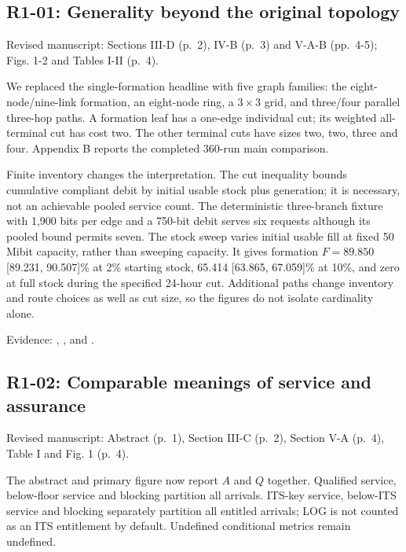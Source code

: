 \documentclass[a4paper,11pt]{article}
\begin{document}
\subsection{R1-01: Generality beyond the original topology}\label{r1-01-generality-beyond-the-original-topology}

Revised manuscript: Sections III-D (p.~2), IV-B (p.~3) and V-A-B (pp.~4-5); Figs. 1-2 and Tables I-II (p.~4).

We replaced the single-formation headline with five graph families: the eight-node/nine-link formation, an eight-node ring, a \(3\times3\) grid, and three/four parallel three-hop paths. A formation leaf has a one-edge individual cut; its weighted all-terminal cut has cost two. The other terminal cuts have sizes two, two, three and four. Appendix B reports the completed 360-run main comparison.

Finite inventory changes the interpretation. The cut inequality bounds cumulative compliant debit by initial usable stock plus generation; it is necessary, not an achievable pooled service count. The deterministic three-branch fixture with 1,900 bits per edge and a 750-bit debit serves six requests although its pooled bound permits seven. The stock sweep varies initial usable fill at fixed 50 Mibit capacity, rather than sweeping capacity. It gives formation \(F=89.850\) {[}89.231, 90.507{]}\% at 2\% starting stock, 65.414 {[}63.865, 67.059{]}\% at 10\%, and zero at full stock during the specified 24-hour cut. Additional paths change inventory and route choices as well as cut size, so the figures do not isolate cardinality alone.

Evidence: , , and .

\subsection{R1-02: Comparable meanings of service and assurance}\label{r1-02-comparable-meanings-of-service-and-assurance}

Revised manuscript: Abstract (p.~1), Section III-C (p.~2), Section V-A (p.~4), Table I and Fig. 1 (p.~4).

The abstract and primary figure now report \(A\) and \(Q\) together. Qualified service, below-floor service and blocking partition all arrivals. ITS-key service, below-ITS service and blocking separately partition all entitled arrivals; LOG is not counted as an ITS entitlement by default. Undefined conditional metrics remain undefined.
\end{document}
